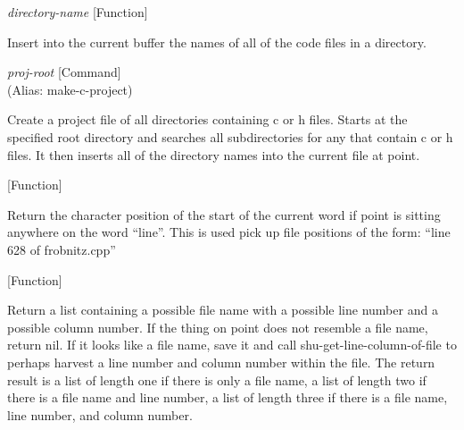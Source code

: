 \vspace{1em}
\noindent
{}
\usebox{\funcname}\emph{directory-name}
 \hfill [Function]

\begin{doc-string}
Insert into the current buffer the names of all of the code files in a directory.
\end{doc-string}

\vspace{1em}
\noindent
{}
\usebox{\funcname}\emph{proj-root}
 \hfill [Command]\\%
 (Alias: make-c-project)

\begin{doc-string}
Create a project file of all directories containing c or h files.
Starts at the specified root directory and searches all subdirectories for
any that contain c or h files.  It then inserts all of the directory names
into the current file at point.
\end{doc-string}

\vspace{1em}
\noindent
{}
\usebox{\funcname}
 \hfill [Function]

\begin{doc-string}
Return the character position of the start of the current word if point is sitting
anywhere on the word ``line''.  This is used pick up file positions of the form:
``line 628 of frobnitz.cpp''
\end{doc-string}

\vspace{1em}
\noindent
{}
\usebox{\funcname}
 \hfill [Function]

\begin{doc-string}
Return a list containing a possible file name with a possible line number
and a possible column number.  If the thing on point does not resemble a file
name, return nil.  If it looks like a file name, save it and call
shu-get-line-column-of-file to perhaps harvest a line number and column number
within the file.  The return result is a list of length one if there is only
a file name, a list of length two if there is a file name and line number, a
list of length three if there is a file name, line number, and column number.
\end{doc-string}

